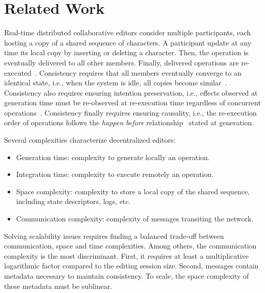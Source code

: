 \section{Related Work}
\label{sec:relatedwork}

Real-time distributed collaborative editors consider multiple
participants, each hosting a copy of a shared sequence of
characters. A participant update at any time its local copy by
inserting or deleting a character. Then, the operation is eventually
delivered to all other members. Finally, delivered operations are
re-executed~\cite{saito2005optimistic}. Consistency requires that all
members eventually converge to an identical state, i.e., when the
system is idle, all copies become
similar~\cite{bailis2013eventual}. Consistency also requires ensuring
intention preservation, i.e., effects observed at generation time must
be re-observed at re-execution time regardless of concurrent
operations~\cite{sun1998achieving}. Consistency finally requires
ensuring causality, i.e., the re-execution order of operations follows
the \emph{happen before} relationship~\cite{lamport1978time} stated at
generation.

Several complexities characterize decentralized editors:
\begin{itemize}
\item Generation time: complexity to generate locally an operation.
\item Integration time: complexity to execute remotely an operation.
\item Space complexity: complexity to store a local copy of the shared sequence,
  including state descriptors, logs, etc.
\item Communication complexity: complexity of messages transiting the network.
\end{itemize}
Solving scalability issues requires finding a balanced trade-off between
communication, space and time complexities.  Among others, the communication
complexity is the most discriminant. First, it requires at least a
multiplicative logarithmic factor compared to the editing session size. Second,
messages contain metadata necessary to maintain consistency. To scale, the space
complexity of these metadata must be sublinear.

